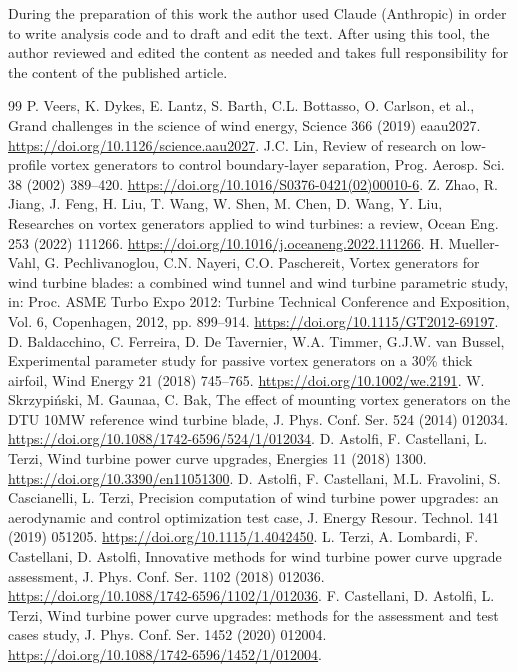 \documentclass[preprint,12pt]{elsarticle}
\begin{document}
During the preparation of this work the author used Claude (Anthropic) in order to write analysis code and to draft and edit the text. After using this tool, the author reviewed and edited the content as needed and takes full responsibility for the content of the published article.


\begin{thebibliography}{99}
 P. Veers, K. Dykes, E. Lantz, S. Barth, C.L. Bottasso, O. Carlson, et al., Grand challenges in the science of wind energy, Science 366 (2019) eaau2027. \url{https://doi.org/10.1126/science.aau2027}.
 J.C. Lin, Review of research on low-profile vortex generators to control boundary-layer separation, Prog. Aerosp. Sci. 38 (2002) 389--420. \url{https://doi.org/10.1016/S0376-0421(02)00010-6}.
 Z. Zhao, R. Jiang, J. Feng, H. Liu, T. Wang, W. Shen, M. Chen, D. Wang, Y. Liu, Researches on vortex generators applied to wind turbines: a review, Ocean Eng. 253 (2022) 111266. \url{https://doi.org/10.1016/j.oceaneng.2022.111266}.
 H. Mueller-Vahl, G. Pechlivanoglou, C.N. Nayeri, C.O. Paschereit, Vortex generators for wind turbine blades: a combined wind tunnel and wind turbine parametric study, in: Proc. ASME Turbo Expo 2012: Turbine Technical Conference and Exposition, Vol. 6, Copenhagen, 2012, pp. 899--914. \url{https://doi.org/10.1115/GT2012-69197}.
 D. Baldacchino, C. Ferreira, D. De Tavernier, W.A. Timmer, G.J.W. van Bussel, Experimental parameter study for passive vortex generators on a 30\% thick airfoil, Wind Energy 21 (2018) 745--765. \url{https://doi.org/10.1002/we.2191}.
 W. Skrzypiński, M. Gaunaa, C. Bak, The effect of mounting vortex generators on the DTU 10MW reference wind turbine blade, J. Phys. Conf. Ser. 524 (2014) 012034. \url{https://doi.org/10.1088/1742-6596/524/1/012034}.
 D. Astolfi, F. Castellani, L. Terzi, Wind turbine power curve upgrades, Energies 11 (2018) 1300. \url{https://doi.org/10.3390/en11051300}.
 D. Astolfi, F. Castellani, M.L. Fravolini, S. Cascianelli, L. Terzi, Precision computation of wind turbine power upgrades: an aerodynamic and control optimization test case, J. Energy Resour. Technol. 141 (2019) 051205. \url{https://doi.org/10.1115/1.4042450}.
 L. Terzi, A. Lombardi, F. Castellani, D. Astolfi, Innovative methods for wind turbine power curve upgrade assessment, J. Phys. Conf. Ser. 1102 (2018) 012036. \url{https://doi.org/10.1088/1742-6596/1102/1/012036}.
 F. Castellani, D. Astolfi, L. Terzi, Wind turbine power curve upgrades: methods for the assessment and test cases study, J. Phys. Conf. Ser. 1452 (2020) 012004. \url{https://doi.org/10.1088/1742-6596/1452/1/012004}.

\end{thebibliography}
\end{document}
